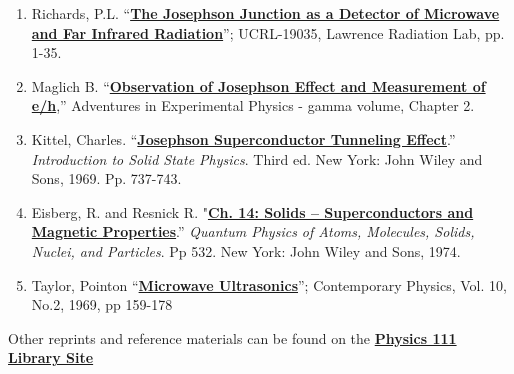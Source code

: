 \documentclass{../lab}
\begin{document}
\begin{enumerate}
    \item Richards, P.L. ``\href{http://physics111.lib.berkeley.edu/Physics111/Reprints/JOS/06-The\_Josephson\_Junction\_as\_a\_Detector.pdf}{\textbf{The Josephson Junction as a Detector of Microwave and Far Infrared Radiation}}''; UCRL-19035, Lawrence Radiation Lab, pp. 1-35.

    \item Maglich B. ``\href{http://physics111.lib.berkeley.edu/Physics111/Reprints/JOS/09-Observation\_of\_Josephson\_Effect.pdf}{\textbf{Observation of Josephson Effect and Measurement of e/h}},'' Adventures in Experimental Physics - gamma volume, Chapter 2.

    \item Kittel, Charles. ``\href{http://physics111.lib.berkeley.edu/Physics111/Reprints/JOS/JOS\_Introduction\%20to\%20the\%20solid\%20state\%20physics.pdf}{\textbf{Josephson Superconductor Tunneling Effect}}.'' \emph{Introduction to Solid State Physics}. Third ed. New York: John Wiley and Sons, 1969. Pp. 737-743.

    \item Eisberg, R. and Resnick R. "\href{http://physics111.lib.berkeley.edu/Physics111/Reprints/JOS/Semiconductors\%20&\%20Magnetic\%20Prop.\%20Ch-14-pg.\%20532.pdf}{\textbf{Ch. 14: Solids -- Superconductors and Magnetic Properties}}.” \emph{Quantum Physics of Atoms, Molecules, Solids, Nuclei, and Particles}. Pp 532. New York: John Wiley and Sons, 1974.

    \item Taylor, Pointon ``\href{http://physics111.lib.berkeley.edu/Physics111/Reprints/JOS/07-Microwave\_Ultrasonics.pdf}{\textbf{Microwave Ultrasonics}}''; Contemporary Physics, Vol. 10, No.2, 1969, pp 159-178

\end{enumerate}

\noindent Other reprints and reference materials can be found on the \href{http://physics111.lib.berkeley.edu/Physics111/Reprints/JOS/JOS\_index.html}{\textbf{Physics 111 Library Site}}
\end{document}

